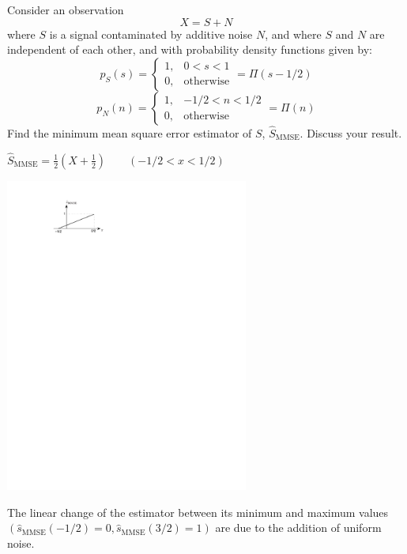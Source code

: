 \question Consider an observation
					 $$ X = S + N  $$
					 where $S$ is  a signal contaminated by additive noise $N$, and where $S$ and $N$ are independent of each other, and with probability density functions given by:
				      $$p_S(s) =
					      \left\{\begin{array}{ll}
						  	\displaystyle
								  1, & 0<s<1 \\
	  							  0, & {\mbox{otherwise}} 
	 					 \end{array} 
						  \right. = \Pi (s - 1/2)
				      $$   
				      $$p_N(n) =
					      \left\{\begin{array}{ll}
						  	\displaystyle
								  1, & -1/2<n<1/2 \\
	  							  0, & {\mbox{otherwise}} 
	 					 \end{array} 
						  \right. = \Pi (n)
				      $$   
	 Find the minimum mean square error estimator of $S$, $\hat{S}_\text{MMSE}$. Discuss your result.

\begin{solution}
   $  \hat S_\text{MMSE} = \displaystyle\frac{1}{2} \left(X + \displaystyle\frac{1}{2}\right) \quad  \quad (-1/2 < x <1/2) $    
   
   \includegraphics[width=8cm, trim=0 23cm 12cm 2cm]{Figuras/fig3E1}
   
   The linear change of the estimator between its minimum and maximum values $(\hat{s}_\text{MMSE} (-1/2) = 0, \hat{s}_\text{MMSE} (3/2) = 1)$ are due to the addition of uniform noise.
   \end{solution}

\fi